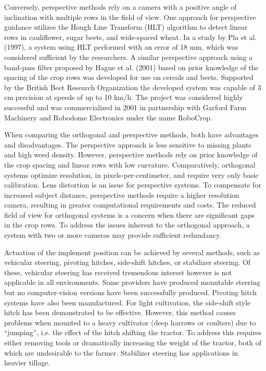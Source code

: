 \documentclass[authoryear]{elsarticle}
\begin{document}
Conversely, perspective methods rely on a camera with a positive angle
of inclination with multiple rows in the field of view. One approach
for perspective guidance utilizes the Hough Line Transform (HLT)
algorithm to detect linear rows in cauliflower, sugar beets, and
wide-spaced wheat. In a study by Pla et al. (1997), a system using HLT
performed with an error of 18 mm, which was considered sufficient by
the researchers. A similar perspective approach using a band-pass
filter proposed by Hague et al. (2001) \citep{hague2001} based on
prior knowledge of the spacing of the crop rows was developed for use
on cereals and beets. Supported by the British Beet Research Organization the
developed system was capable of 3 cm precision at speeds of up to 10
km/h. The project was considered highly successful and was
commercialized in 2001 in partnership with Garford Farm Machinery and
Robodome Electronics under the name RoboCrop.

When comparing the orthogonal and perspective methods, both have
advantages and disadvantages. The perspective approach is less
sensitive to missing plants and high weed density. However,
perspective methods rely on prior knowledge of the crop spacing and
linear rows with low curvature. Comparatively, orthogonal systems
optimize resolution, in pixels-per-centimeter, and require very only
basic calibration. Lens distortion is an issue for perspective
systems. To compensate for increased subject distance, perspective
methods require a higher resolution camera, resulting in greater
computational requirements and costs. The reduced field of view for
orthogonal systems is a concern when there are significant gaps in the
crop rows. To address the issues inherent to the orthogonal approach,
a system with two or more cameras may provide sufficient redundancy.

Actuation of the implement position can be achieved by several
methods, such as vehicular steering, pivoting hitches, side-shift
hitches, or stabilizer steering. Of these, vehicular steering has
received tremendous interest however is not applicable in all
environments. Some providers have produced mountable steering but no
computer-vision versions have been successfully produced. Pivoting
hitch systems have also been manufactured. For light cultivation, the
side-shift style hitch has been demonstrated to be effective. However,
this method causes problems when mounted to a heavy cultivator (deep
harrows or coulters) due to “jumping”, i.e. the effect of the hitch
shifting the tractor. To address this requires either removing tools
or dramatically increasing the weight of the tractor, both of which
are undesirable to the farmer. Stabilizer steering has applications in
heavier tillage.
\end{document}
